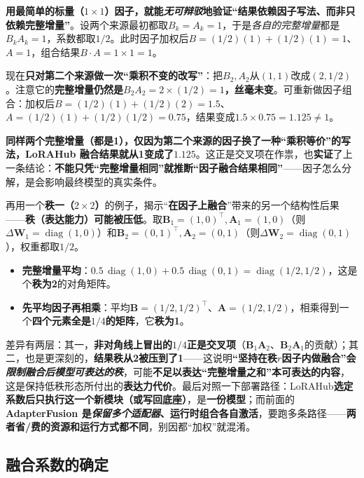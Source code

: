 \textbf{用最简单的标量（$1\times1$）因子，就能\emph{无可辩驳}地验证“结果依赖因子写法、而非只依赖完整增量”}。设两个来源最初都取$B_k=A_k=1$，于是\emph{各自的完整增量}都是$B_kA_k=1$，系数都取$1/2$。此时因子加权后$B=(1/2)(1)+(1/2)(1)=1$、$A=1$，组合结果$B\cdot A=1\times1=1$。

现在\textbf{只对第二个来源做一次“乘积不变的改写”}：把$B_2,A_2$从$(1,1)$改成$(2,1/2)$。注意它的\textbf{完整增量仍然是}$B_2A_2=2\times(1/2)=1$\textbf{，丝毫未变}。可重新做因子组合：加权后$B=(1/2)(1)+(1/2)(2)=1.5$、$A=(1/2)(1)+(1/2)(1/2)=0.75$，结果变成$1.5\times0.75=1.125\neq1$。

\textbf{同样两个完整增量（都是1），仅因为第二个来源的因子换了一种“乘积等价”的写法，LoRAHub 融合结果就从1变成了$1.125$}。这正是交叉项在作祟，也\textbf{实证}了上一条结论：\textbf{不能只凭“完整增量相同”就推断“因子融合结果相同”}——因子怎么分解，是会影响最终模型的真实条件。

再用一个\textbf{秩一（$2\times2$）}的例子，揭示“\textbf{在因子上融合}”带来的另一个结构性后果——\textbf{秩（表达能力）可能被压低}。取$\bm{B}_1=(1,0)^\top,\bm{A}_1=(1,0)$（则$\Delta\bm{W}_1=\operatorname{diag}(1,0)$）和$\bm{B}_2=(0,1)^\top,\bm{A}_2=(0,1)$（则$\Delta\bm{W}_2=\operatorname{diag}(0,1)$），权重都取$1/2$。
\begin{itemize}\item \textbf{完整增量平均}：$0.5\,\operatorname{diag}(1,0)+0.5\,\operatorname{diag}(0,1)=\operatorname{diag}(1/2,1/2)$，这是个\textbf{秩为2}的对角矩阵。\item \textbf{先平均因子再相乘}：平均$\bm{B}=(1/2,1/2)^\top$、$\bm{A}=(1/2,1/2)$，相乘得到一个\textbf{四个元素全是$1/4$的矩阵}，它\textbf{秩为1}。\end{itemize}
差异有两层：其一，\textbf{非对角线上冒出的$1/4$正是交叉项}（$\bm{B}_1\bm{A}_2$、$\bm{B}_2\bm{A}_1$的贡献）；其二，也是更深刻的，\textbf{结果秩从2被压到了1}——这说明\textbf{“坚持在秩$r$因子内做融合”会\emph{限制融合后模型可表达的秩}}，可能\textbf{不足以表达“完整增量之和”本可表达的内容}，这是保持低秩形态所付出的\textbf{表达力代价}。最后对照一下部署路径：LoRAHub\textbf{选定系数后只执行这一个新模块（或写回底座）}，是\textbf{一份模型}；而前面的\textbf{AdapterFusion 是\emph{保留多个适配器}、运行时组合各自激活}，要跑多条路径——\textbf{两者省/费的资源和运行方式都不同}，别因都“加权”就混淆。

\subsection{融合系数的确定}
\label{sec:ket-integration-coefficients}

